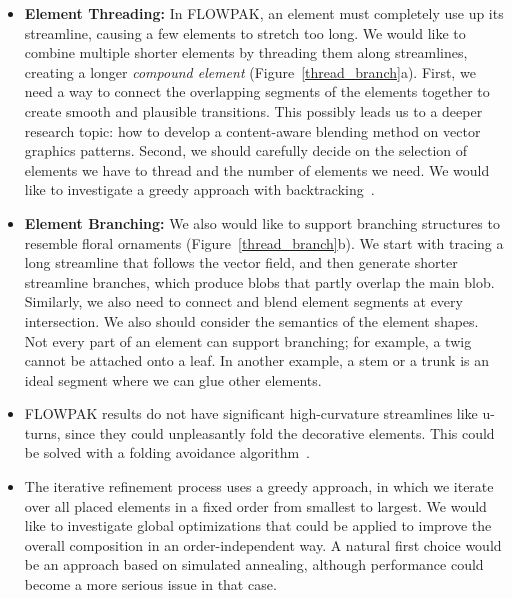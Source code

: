 \begin{itemize}

\item 
\newtext
{
\textbf{Element Threading:}
In FLOWPAK, an element must completely use up its streamline, 
causing a few elements to stretch too long.
We would like to combine multiple shorter elements
by threading them along streamlines, creating
a longer \textit{compound element} (Figure~\ref{thread_branch}a).
First, we need a way to connect the overlapping segments of the elements together
to create smooth and plausible transitions.
This possibly leads us to a deeper research topic:
how to develop a content-aware blending method on vector graphics patterns.
Second, we should carefully decide on the selection of elements we have to thread and
the number of elements we need. We would like to investigate a greedy approach
with backtracking~\cite{Kim2002}.
}

\item 
\newtext
{
\textbf{Element Branching:}
We also would like to support
branching structures to resemble floral ornaments (Figure~\ref{thread_branch}b).
We start with tracing a long streamline that follows the vector field,
and then generate shorter streamline branches,
which produce blobs that partly overlap the main blob.
Similarly, we also need to connect and blend element segments
at every intersection. 
We also should consider the semantics of the element shapes.
Not every part of an element can support branching; for example, a twig
cannot be attached onto a leaf.
In another example, a stem or a trunk is an ideal segment where we can glue other elements.
}


\item {}
FLOWPAK results do not have significant high-curvature streamlines like u-turns, 
since they could unpleasantly fold the decorative elements. This could be solved with a folding avoidance algorithm~\cite{Asente2010}.

\item {}
The iterative refinement process uses a greedy approach, in which we 
iterate over all placed elements in a fixed order from smallest to largest.
We would like to investigate global optimizations
that could be applied to improve the overall composition in an 
order-independent way.  A natural first choice would be an approach based
on simulated annealing, although performance could become a more serious
issue in that case.


\end{itemize}
